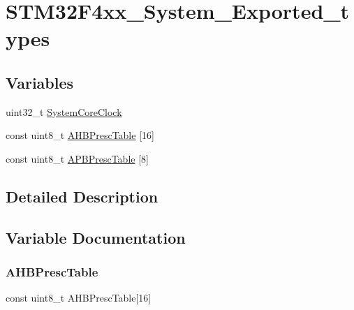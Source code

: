 \hypertarget{group___s_t_m32_f4xx___system___exported__types}{}\section{S\+T\+M32\+F4xx\+\_\+\+System\+\_\+\+Exported\+\_\+types}
\label{group___s_t_m32_f4xx___system___exported__types}
\subsection*{Variables}
\begin{DoxyCompactItemize}
\item 
uint32\+\_\+t \mbox{\hyperlink{group___s_t_m32_f4xx___system___exported__types_gaa3cd3e43291e81e795d642b79b6088e6}{System\+Core\+Clock}}
\item 
const uint8\+\_\+t \mbox{\hyperlink{group___s_t_m32_f4xx___system___exported__types_ga6e1d9cd666f0eacbfde31e9932a93466}{A\+H\+B\+Presc\+Table}} \mbox{[}16\mbox{]}
\item 
const uint8\+\_\+t \mbox{\hyperlink{group___s_t_m32_f4xx___system___exported__types_ga5b4f8b768465842cf854a8f993b375e9}{A\+P\+B\+Presc\+Table}} \mbox{[}8\mbox{]}
\end{DoxyCompactItemize}


\subsection{Detailed Description}


\subsection{Variable Documentation}
\mbox{\label{group___s_t_m32_f4xx___system___exported__types_ga6e1d9cd666f0eacbfde31e9932a93466}} 
\subsubsection{\texorpdfstring{A\+H\+B\+Presc\+Table}{AHBPrescTable}}
{\footnotesize\ttfamily const uint8\+\_\+t A\+H\+B\+Presc\+Table\mbox{[}16\mbox{]}}

